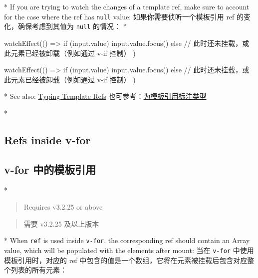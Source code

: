 \begin{paracol}{2}
\switchcolumn[0]*%
If you are trying to watch the changes of a template ref, make sure to
account for the case where the ref has \texttt{null} value:
\switchcolumn
如果你需要侦听一个模板引用 ref 的变化，确保考虑到其值为 \texttt{null}
的情况：
\switchcolumn[0]*%
\begin{codeJs}
watchEffect(() => {
  if (input.value) {
    input.value.focus()
  } else {
    // 此时还未挂载，或此元素已经被卸载（例如通过 v-if 控制）
  }
})
\end{codeJs}
\switchcolumn
\begin{codeJs}
watchEffect(() => {
  if (input.value) {
    input.value.focus()
  } else {
    // 此时还未挂载，或此元素已经被卸载（例如通过 v-if 控制）
  }
})
\end{codeJs}
\switchcolumn[0]*%
See also:
\href{https://vuejs.org/guide/typescript/composition-api.html\#typing-template-refs}{Typing
Template Refs}
\switchcolumn
也可参考：\href{https://cn.vuejs.org/guide/typescript/composition-api.html\#typing-template-refs}{为模板引用标注类型}


\switchcolumn[0]*%
\subsection{Refs inside v-for}
\switchcolumn
\subsection{v-for 中的模板引用}
\switchcolumn[0]*%
\begin{quote}
Requires v3.2.25 or above
\end{quote}
\switchcolumn
\begin{quote}
需要 v3.2.25 及以上版本
\end{quote}
\switchcolumn[0]*%
When \texttt{ref} is used inside \texttt{v-for}, the corresponding ref
should contain an Array value, which will be populated with the elements
after mount:
\switchcolumn
当在 \texttt{v-for} 中使用模板引用时，对应的 ref
中包含的值是一个数组，它将在元素被挂载后包含对应整个列表的所有元素：



\end{paracol}
